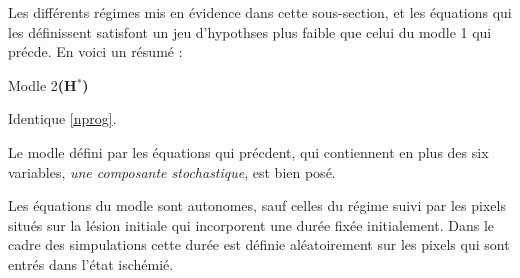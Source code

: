 \ligneinter
Les diff\'erents r\'egimes mis en \'evidence dans cette sous-section, et les \'equations qui les d\'efinissent satisfont %
un jeu d'hypothses plus faible que celui du modle 1 qui pr\'ecde. En voici un r\'esum\'e :

\begin{modmerate}{Modle 2}{\textbf{(H${}^{\ast}$\arabic*)}}
\item Identique  \ref{nprog}.
\item\label{var_compf} Le modle d\'efini par les \'equations qui pr\'ecdent, %
qui contiennent en plus des six variables, \emph{une composante stochastique}, est bien pos\'e.
\item\label{autof} Les \'equations du modle sont autonomes, sauf celles du r\'egime suivi par les pixels situ\'es sur la l\'esion initiale %
qui incorporent une dur\'ee fix\'ee initialement. %
Dans le cadre des simpulations cette dur\'ee est d\'efinie al\'eatoirement sur les pixels qui sont entr\'es dans l'\'etat isch\'emi\'e.
\end{modmerate}

